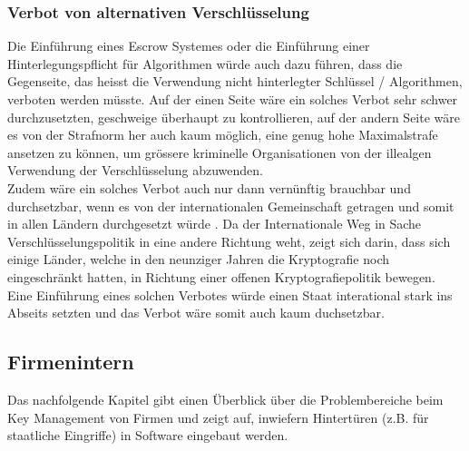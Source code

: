 	
	\subsubsection{Verbot von alternativen Verschlüsselung}
Die Einführung eines Escrow Systemes oder die Einführung einer Hinterlegungspflicht für Algorithmen würde auch dazu führen, dass die Gegenseite, das heisst die Verwendung nicht hinterlegter Schlüssel / Algorithmen, verboten werden müsste. Auf der einen Seite wäre ein solches Verbot sehr schwer durchzusetzten, geschweige überhaupt zu kontrollieren, auf der andern Seite wäre es von der Strafnorm her auch kaum möglich, eine genug hohe Maximalstrafe ansetzen zu können, um grössere kriminelle Organisationen von der illealgen Verwendung der Verschlüsselung abzuwenden. \cite{adminch} \\ %
Zudem wäre ein solches Verbot auch nur dann vernünftig brauchbar und durchsetzbar, wenn es von der internationalen Gemeinschaft getragen und somit in allen Ländern durchgesetzt würde \cite{denning}. Da der Internationale Weg in Sache Verschlüsselungspolitik in eine andere Richtung weht, zeigt sich darin, dass sich einige Länder, welche in den neunziger Jahren die Kryptografie noch eingeschränkt hatten, in Richtung einer offenen Kryptografiepolitik bewegen. \cite{clipperchip} \cite{adminch} \\ %
Eine Einführung eines solchen Verbotes würde einen Staat interational stark ins Abseits setzten und das Verbot wäre somit auch kaum duchsetzbar.
		
	\subsection{Firmenintern}
Das nachfolgende Kapitel gibt einen Überblick über die Problembereiche beim Key Management von Firmen und zeigt auf, inwiefern Hintertüren (z.B. für staatliche Eingriffe) in Software eingebaut werden.

